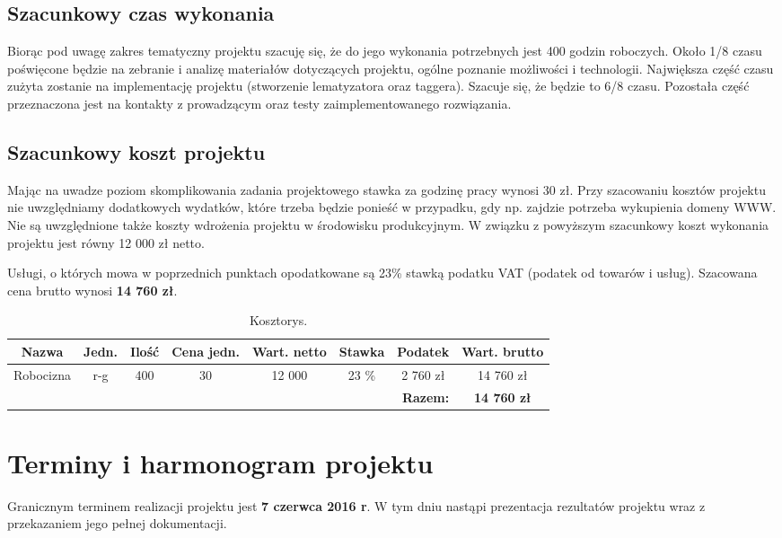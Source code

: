 \subsection*{Szacunkowy czas wykonania}
Biorąc pod uwagę zakres tematyczny projektu szacuję się, że do jego wykonania potrzebnych jest 400 godzin roboczych. Około 1/8 czasu poświęcone będzie na zebranie i analizę materiałów dotyczących projektu, ogólne poznanie możliwości i technologii. Największa część czasu zużyta zostanie na implementację projektu (stworzenie lematyzatora oraz taggera). Szacuje się, że będzie to 6/8 czasu. Pozostała część przeznaczona jest na kontakty z prowadzącym oraz testy zaimplementowanego rozwiązania.

\subsection*{Szacunkowy koszt projektu}
Mając na uwadze poziom skomplikowania zadania projektowego stawka za godzinę pracy wynosi 30 zł. Przy szacowaniu kosztów projektu nie uwzględniamy dodatkowych wydatków, które trzeba będzie ponieść w przypadku, gdy np. zajdzie potrzeba wykupienia domeny WWW. Nie są uwzględnione także koszty wdrożenia projektu w środowisku produkcyjnym. W związku z powyższym szacunkowy koszt wykonania projektu jest równy 12 000 zł netto. 

Usługi, o których mowa w poprzednich punktach opodatkowane są 23\% stawką podatku VAT (podatek od towarów i usług). Szacowana cena brutto wynosi \textbf{14 760 zł}.

\begin{table}[H]
	\centering
	\caption{Kosztorys.}
	\smallskip
	\begin{tabular}{|c|c|c|c|c|c|c|c|}
		\hline
		\textbf{Nazwa} & \textbf{Jedn.} & \textbf{Ilość} & \textbf{Cena jedn.} & \textbf{Wart. netto} & \textbf{Stawka} & \textbf{Podatek} & \textbf{Wart. brutto} \\\hline
		Robocizna & r-g & 400 & 30 & 12 000 & 23 \% & 2 760 zł & 14 760 zł \\\hline
		\multicolumn{7}{r|}{\bf Razem:} & \textbf{14 760 zł} \\\cline{8-8}
	\end{tabular}
\end{table}
	
\section{Terminy i harmonogram projektu}
Granicznym terminem realizacji projektu jest \textbf{7 czerwca 2016 r}. W tym dniu nastąpi prezentacja rezultatów projektu wraz z przekazaniem jego pełnej dokumentacji.


